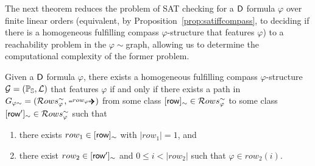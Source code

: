 The next theorem reduces the problem of SAT checking for a $\mathsf{D}$ formula $\varphi$ over finite linear orders (equivalent, by Proposition~\ref{prop:satiffcompass}, to deciding if there is a homogeneous fulfilling compass $\varphi$-structure that features $\varphi$) to a reachability problem in the $\varphi\!\sim$graph, allowing us to determine the computational complexity of the former problem.
%
\begin{theorem}\label{thm:path_iff_sat}
Given a $\mathsf{D}$ formula $\varphi$, there exists a homogeneous fulfilling compass $\varphi$-structure $\mathcal{G}=(\mathbb{P}_{\mathbb{S}}, \mathcal{L})$ that features $\varphi$
if and only if there exists a path  in $G_{\varphi \sim}=(\Rows^\sim,\rownext)$
from some class $[\text{{\sffamily row}}]_\sim\in\mathcal{R} ows_{\varphi}^\sim$ to some class $[\text{{\sffamily row}}']_\sim\in\mathcal{R} ows_{\varphi}^\sim$ such that
\begin{enumerate}
    \item there exists $row_1\in[\text{{\sffamily row}}]_\sim$ with $|row_1|=1$, and
    \item there exist $row_2\in[\text{{\sffamily row}}']_\sim$ and $0\leq i<|row_2|$ such that $\varphi\in row_2(i)$.
\end{enumerate}
\end{theorem} 
%
